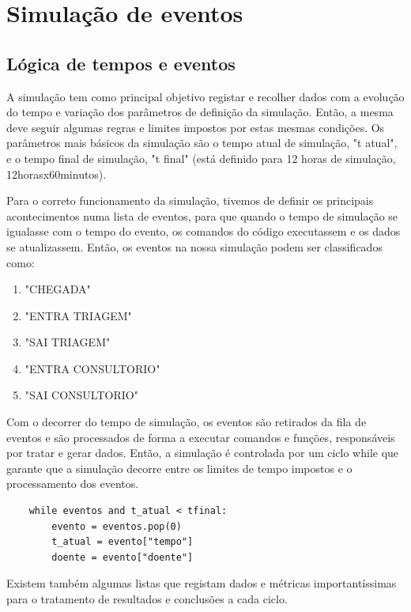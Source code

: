 \documentclass[12pt,a4paper]{article} %
\begin{document}
    \section{Simulação de eventos}

    \subsection{Lógica de tempos e eventos}

    A simulação tem como principal objetivo registar e recolher dados com a evolução do tempo e variação dos parâmetros de definição da simulação. Então, a mesma deve seguir algumas regras e limites impostos por estas mesmas condições. Os parâmetros mais básicos da simulação são o tempo atual de simulação, "t atual", e o tempo final de simulação, "t final" (está definido para 12 horas de simulação, 12horasx60minutos).

    \medskip
     Para o correto funcionamento da simulação, tivemos de definir os principais acontecimentos numa lista de eventos, para que quando o tempo de simulação se igualasse com o tempo do evento, os comandos do código executassem e os dados se atualizassem. Então, os eventos na nossa simulação podem ser classificados como:
        \begin{enumerate}
            \item "CHEGADA"
            \item "ENTRA TRIAGEM"
            \item "SAI TRIAGEM"
            \item "ENTRA CONSULTORIO"
            \item "SAI CONSULTORIO"
        \end{enumerate}
    
    \medskip
    Com o decorrer do tempo de simulação, os eventos são retirados da fila de eventos e são processados de forma a executar comandos e funções, responsáveis por tratar e gerar dados. Então, a simulação é controlada por um ciclo while que garante que a simulação decorre entre os limites de tempo impostos e o processamento dos eventos.

\begin{verbatim}
    while eventos and t_atual < tfinal:
        evento = eventos.pop(0)
        t_atual = evento["tempo"]
        doente = evento["doente"]  
\end{verbatim}

    \medskip
    Existem também algumas listas que registam dados e métricas importantíssimas para o tratamento de resultados e conclusões a cada ciclo. 
\end{document}

